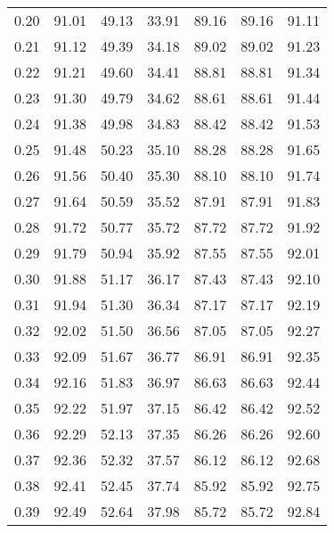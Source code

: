\begin{tabular}{|c|c|c|c|c|c|c|}
      0.20 &     91.01 &     49.13 &      33.91 &   89.16 &      89.16 &         91.11 \\
      0.21 &     91.12 &     49.39 &      34.18 &   89.02 &      89.02 &         91.23 \\
      0.22 &     91.21 &     49.60 &      34.41 &   88.81 &      88.81 &         91.34 \\
      0.23 &     91.30 &     49.79 &      34.62 &   88.61 &      88.61 &         91.44 \\
      0.24 &     91.38 &     49.98 &      34.83 &   88.42 &      88.42 &         91.53 \\
      0.25 &     91.48 &     50.23 &      35.10 &   88.28 &      88.28 &         91.65 \\
      0.26 &     91.56 &     50.40 &      35.30 &   88.10 &      88.10 &         91.74 \\
      0.27 &     91.64 &     50.59 &      35.52 &   87.91 &      87.91 &         91.83 \\
      0.28 &     91.72 &     50.77 &      35.72 &   87.72 &      87.72 &         91.92 \\
      0.29 &     91.79 &     50.94 &      35.92 &   87.55 &      87.55 &         92.01 \\
      0.30 &     91.88 &     51.17 &      36.17 &   87.43 &      87.43 &         92.10 \\
      0.31 &     91.94 &     51.30 &      36.34 &   87.17 &      87.17 &         92.19 \\
      0.32 &     92.02 &     51.50 &      36.56 &   87.05 &      87.05 &         92.27 \\
      0.33 &     92.09 &     51.67 &      36.77 &   86.91 &      86.91 &         92.35 \\
      0.34 &     92.16 &     51.83 &      36.97 &   86.63 &      86.63 &         92.44 \\
      0.35 &     92.22 &     51.97 &      37.15 &   86.42 &      86.42 &         92.52 \\
      0.36 &     92.29 &     52.13 &      37.35 &   86.26 &      86.26 &         92.60 \\
      0.37 &     92.36 &     52.32 &      37.57 &   86.12 &      86.12 &         92.68 \\
      0.38 &     92.41 &     52.45 &      37.74 &   85.92 &      85.92 &         92.75 \\
      0.39 &     92.49 &     52.64 &      37.98 &   85.72 &      85.72 &         92.84 \\

\end{tabular}

